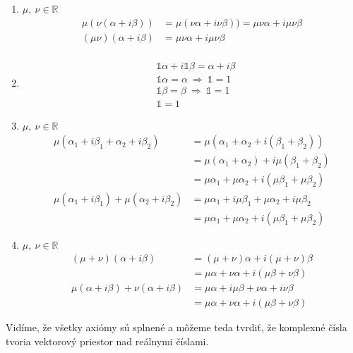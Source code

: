 \documentclass[a4paper, 10pt, ]{article}
\begin{document}
\begin{example}
\begin{enumerate}
        \item $\mu, \ \nu \in \mathbb{R}$
        \begin{align*}
            \mu (\nu (\alpha + i \beta)) &= \mu (\nu \alpha + i \nu \beta)) = \mu \nu \alpha + i \mu \nu \beta \\
            (\mu \nu) (\alpha + i \beta) &= \mu \nu \alpha + i \mu \nu \beta \\
        \end{align*}

        \item
        \begin{align*}
            &\mathbb{1} \alpha + i \mathbb{1} \beta = \alpha + i \beta \\
            &\mathbb{1} \alpha = \alpha \ \Longrightarrow \ \mathbb{1} = 1 \\
            &\mathbb{1} \beta = \beta \ \Longrightarrow \ \mathbb{1} = 1 \\
            &\mathbb{1} = 1 
        \end{align*}

        \item $\mu, \ \nu \in \mathbb{R}$
        \begin{align*}
            \mu (\alpha_1 + i \beta_1 + \alpha_2 + i\beta_2) &= 
            \mu (\alpha_1 + \alpha_2 + i (\beta_1 + \beta_2)) \\ &= 
            \mu(\alpha_1 + \alpha_2) + i \mu (\beta_1 + \beta_2) \\ & = 
            \mu \alpha_1 + \mu \alpha_2 + i (\mu \beta_1 + \mu \beta_2) \\ 
            \mu (\alpha_1 + i \beta_1) + \mu (\alpha_2 + i \beta_2) &= 
            \mu \alpha_1 + i \mu \beta_1 + \mu \alpha_2 + i \mu \beta_2 \\ &=
            \mu \alpha_1 + \mu \alpha_2 + i (\mu \beta_1 + \mu \beta_2)  
        \end{align*}

        \item $\mu, \ \nu \in \mathbb{R}$
        \begin{align*}
            (\mu + \nu) (\alpha + i \beta) &= 
            (\mu + \nu) \alpha + i (\mu + \nu) \beta \\ &=
            \mu \alpha + \nu \alpha + i (\mu \beta + \nu \beta) \\
            \mu (\alpha + i \beta) + \nu (\alpha + i \beta) &= 
            \mu \alpha + i \mu \beta + \nu \alpha + i \nu \beta \\ &=
            \mu \alpha + \nu \alpha + i (\mu \beta + \nu \beta)  
        \end{align*}
    \end{enumerate}
    Vidíme, že všetky axiómy sú splnené a môžeme teda tvrdiť, že komplexné čísla tvoria vektorový priestor nad reálnymi číslami.
\end{example}
\end{document}
